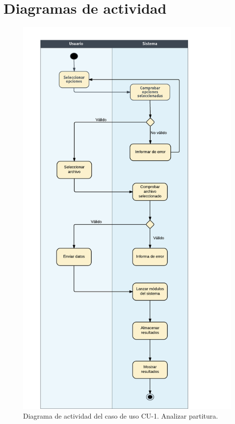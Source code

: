 

\section{Diagramas de actividad}

\begin{figure}[H]
	\centering
	\includegraphics[scale=0.65]{imagenes/diagramaAct.png}
	\caption{Diagrama de actividad del caso de uso CU-1. Analizar partitura.}
	\label{fig2.5.1}
\end{figure}